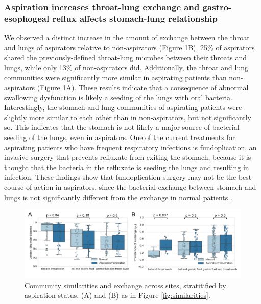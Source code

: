\documentclass[12pt]{article}
\begin{document}
\subsubsection{Aspiration increases throat-lung exchange and gastro-esophogeal reflux affects stomach-lung relationship}

We observed a distinct increase in the amount of exchange between the 
throat and lungs of aspirators relative to non-aspirators (Figure \ref{fig:aspirators}B).
25\% of aspirators shared
the previously-defined throat-lung microbes between their throats and lungs, while only 13\% of 
non-aspirators did. Additionally, the throat and lung communities
were significantly more similar in aspirating patients than non-aspirators (Figure \ref{fig:aspirators}A). These results indicate that a consequence of abnormal swallowing
dysfunction is likely a seeding of the lungs with oral bacteria.
Interestingly, the stomach and lung communities of aspirating
patients were slightly more similar to each other than in non-aspirators, but not significantly so.
This indicates that the stomach is not likely a major source
of bacterial seeding of the lungs, even in aspirators. One of the current treatments for
aspirating patients who have frequent respiratory infections is fundoplication,
an invasive surgery that prevents refluxate from exiting the stomach, because it is thought
that the bacteria in the refluxate is seeding the lungs
and resulting in infection.
These findings show that fundoplication surgery may not be the best course of action in aspirators, since 
the bacterial exchange between stomach and lungs is not
significantly different from the exchange in normal patients \cite{debenedictis-asp_dis-2009, kawahara-fundo-2004}.

\begin{figure}[h]
\begin{center}
	\includegraphics[scale=0.65]{aspiration}
	\caption{Community similarities and exchange across sites, stratitified by aspiration status.
	(A) and (B) as in Figure \ref{fig:similarities}.}
	\label{fig:aspirators}
\end{center}
\end{figure}
\end{document}
